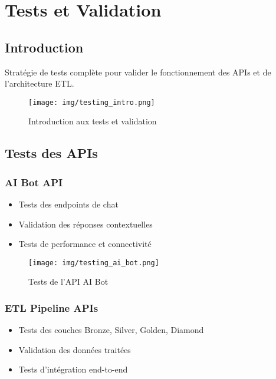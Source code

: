 \section{Tests et Validation}

\subsection{Introduction}
Stratégie de tests complète pour valider le fonctionnement des APIs et de l'architecture ETL.

\begin{figure}[H]
    \centering
    \texttt{[image: img/testing\_intro.png]}
    \caption{Introduction aux tests et validation}
    \label{fig:testing_intro}
\end{figure}

\subsection{Tests des APIs}
\subsubsection{AI Bot API}
\begin{itemize}
    \item Tests des endpoints de chat
    \item Validation des réponses contextuelles
    \item Tests de performance et connectivité
\end{itemize}

\begin{figure}[H]
    \centering
    \texttt{[image: img/testing\_ai\_bot.png]}
    \caption{Tests de l'API AI Bot}
    \label{fig:testing_ai_bot}
\end{figure}

\subsubsection{ETL Pipeline APIs}
\begin{itemize}
    \item Tests des couches Bronze, Silver, Golden, Diamond
    \item Validation des données traitées
    \item Tests d'intégration end-to-end
\end{itemize}

